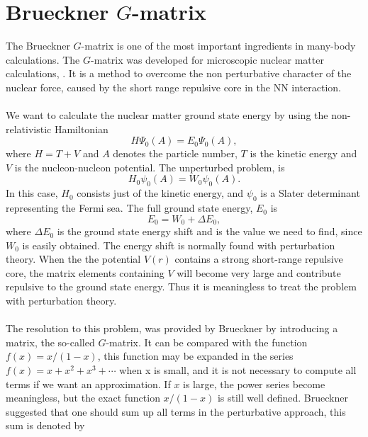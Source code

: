 \chapter{Brueckner $G$-matrix}
\label{bgm}

The Brueckner $G$-matrix is one of the most important ingredients in many-body
calculations. The $G$-matrix was developed for microscopic nuclear matter
calculations, \cite{bruecknerG,bbp1963}. It is a method to overcome the non perturbative character of the
nuclear force, caused by the short range repulsive core in the NN
interaction.\\ 
\\
We want to calculate the nuclear matter ground state energy by using the non-relativistic Hamiltonian
\begin{equation*}
		H\Psi_0(A)=E_0\Psi_0(A),
\end{equation*}
where $H=T+V$ and $A$ denotes the particle number, $T$ is the kinetic energy and
$V$ is the nucleon-nucleon potential.
The unperturbed problem, is 
\begin{equation*}
		H_0\psi_0(A)=W_0\psi_0(A).
\end{equation*}
In this case, $H_0$ consists just of the kinetic energy, and $\psi_0$ is a Slater determinant representing the Fermi sea. The full ground state energy, $E_0$ is
\begin{equation*}
		E_0=W_0+\Delta E_0,
\end{equation*}
where $\Delta E_0$ is the ground state energy shift and is the value we need to find,
since $W_0$ is easily obtained. The energy shift is normally found with
perturbation theory. When the the potential $V(r)$ contains a strong
short-range repulsive core, the matrix elements containing $V$ will become very
large and contribute repulsive to the ground state energy. Thus it is
meaningless to treat the problem with perturbation theory.\\
\\
The resolution to this problem, was provided by Brueckner by introducing a
matrix, the so-called $G$-matrix.  It can be compared with the function\\ $f(x)=x/(1-x)$,
this function may be expanded in the series $f(x)=x+x^2+x^3+\cdots$ when x is
small, and it is not necessary to compute all terms if we want an
approximation. If $x$ is large, the power series become meaningless, but the
exact function $x/(1-x)$ is still well defined. Brueckner suggested that one
should sum up all terms in the perturbative approach, this sum is denoted by
